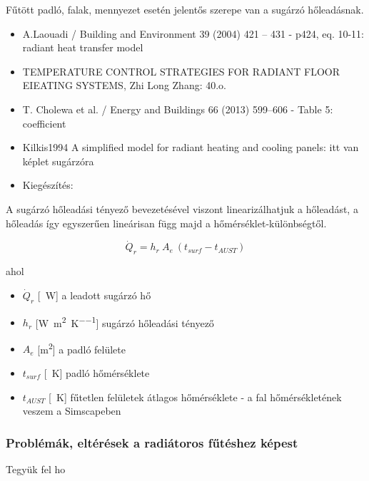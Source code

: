 Fűtött padló, falak, mennyezet esetén jelentős szerepe van a sugárzó hőleadásnak.

\begin{itemize}[itemsep=0pt,topsep=0pt,parsep=0pt,partopsep=0pt]
	\item A.Laouadi / Building and Environment 39 (2004) 421 – 431 - p424, eq. 10-11: radiant heat transfer model
	\item TEMPERATURE CONTROL STRATEGIES FOR RADIANT FLOOR EIEATING SYSTEMS, Zhi Long Zhang: 40.o.  
	\item \cite{CHOLEWA2013599} T. Cholewa et al. / Energy and Buildings 66 (2013) 599–606 - Table 5: coefficient
	\item Kilkis1994 A simplified model for radiant heating and cooling panels: itt van képlet sugárzóra
	\item Kiegészítés: \cite[349.~o.]{Herz}
\end{itemize}  

A sugárzó hőleadási tényező bevezetésével viszont linearizálhatjuk a hőleadást, a hőleadás így egyszerűen lineárisan függ majd a hőmérséklet-különbségtől.

\begin{equation} \label{equation-radi-and-convective-htotal}
\dot Q_{r} = h_r ~ A_e ~ \left(t_{surf}-t_{AUST}\right)
\end{equation}

ahol
\begin{itemize}[itemsep=3pt,topsep=0pt,parsep=0pt,partopsep=0pt]
	\item[] $\dot{Q}_{r}$ [\SI{}{\watt}] a leadott sugárzó hő
	\item[] $h_r$ [\si[per-mode = fraction]{\watt\per\meter\squared\per\kelvin}] sugárzó hőleadási tényező
	\item[] $A_e$ [\si{\metre\squared}] a padló felülete
	\item[] $t_{surf}$ [\SI{}{\kelvin}] padló hőmérséklete
	\item[] $t_{AUST}$ [\SI{}{\kelvin}] fűtetlen felületek átlagos hőmérséklete - a fal hőmérsékletének veszem a Simscapeben
\end{itemize}

\subsubsection{Problémák, eltérések a radiátoros fűtéshez képest}

Tegyük fel ho  

\pagebreak